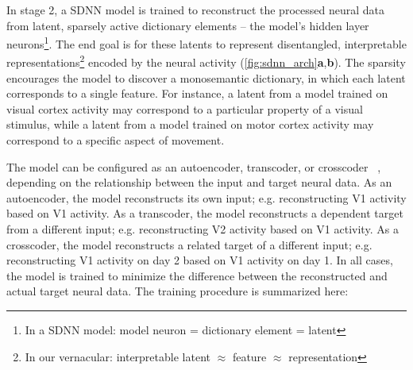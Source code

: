 In stage 2, a SDNN model is trained to reconstruct the processed neural data from latent, sparsely active dictionary elements -- the model's hidden layer neurons\footnote{In a SDNN model: model neuron = dictionary element = latent}. The end goal is for these latents to represent disentangled, interpretable representations\footnote{In our vernacular: interpretable latent $\approx$ feature $\approx$ representation} encoded by the neural activity (\autoref{fig:sdnn_arch}\textbf{a},\textbf{b}). The sparsity encourages the model to discover a monosemantic dictionary, in which each latent corresponds to a single feature. For instance, a latent from a model trained on visual cortex activity may correspond to a particular property of a visual stimulus, while a latent from a model trained on motor cortex activity may correspond to a specific aspect of movement.

The model can be configured as an autoencoder, transcoder, or crosscoder ~\cite{lindsey_2024_crosscoders}, depending on the relationship between the input and target neural data. As an autoencoder, the model reconstructs its own input; e.g. reconstructing V1 activity based on V1 activity. As a transcoder, the model reconstructs a dependent target from a different input; e.g. reconstructing V2 activity based on V1 activity. As a crosscoder, the model reconstructs a related target of a different input; e.g. reconstructing V1 activity on day 2 based on V1 activity on day 1. In all cases, the model is trained to minimize the difference between the reconstructed and actual target neural data. The training procedure is summarized here:

